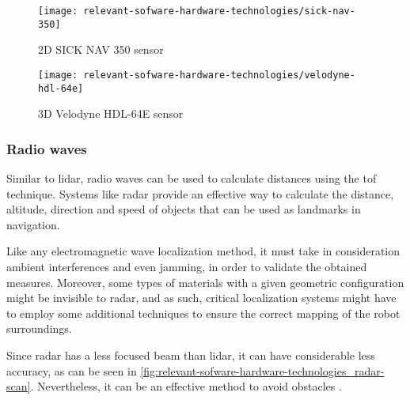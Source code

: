 \begin{savenotes}
\begin{figure}[H]
	\centering
	\begin{minipage}[h]{.47\textwidth}
		\centering
		\texttt{[image: relevant-sofware-hardware-technologies/sick-nav-350]}
		\caption[2D SICK NAV 350 sensor]{2D SICK NAV 350 sensor\protect\footnotemark}
		\label{fig:relevant-sofware-hardware-technologies_sick-nav-350}
	\end{minipage}\hfill
{}
	\begin{minipage}[h]{.47\textwidth}
		\centering
		\texttt{[image: relevant-sofware-hardware-technologies/velodyne-hdl-64e]}
		\caption[3D Velodyne HDL-64E sensor sensor]{3D Velodyne HDL-64E sensor\protect\footnotemark}
		\label{fig:relevant-sofware-hardware-technologies_velodyne-hdl-64e}
	\end{minipage}
\end{figure}
\end{savenotes}


\subsubsection{Radio waves}

Similar to \gls{lidar}, radio waves can be used to calculate distances using the \gls{tof} technique. Systems like \gls{radar} provide an effective way to calculate the distance, altitude, direction and speed of objects that can be used as landmarks in navigation.

Like any electromagnetic wave localization method, it must take in consideration ambient interferences and even jamming, in order to validate the obtained measures. Moreover, some types of materials with a given geometric configuration might be invisible to \gls{radar}, and as such, critical localization systems might have to employ some additional techniques to ensure the correct mapping of the robot surroundings.

Since \gls{radar} has a less focused beam than \gls{lidar}, it can have considerable less accuracy, as can be seen in \cref{fig:relevant-sofware-hardware-technologies_radar-scan}. Nevertheless, it can be an effective method to avoid obstacles \cite{Wu2007}.


